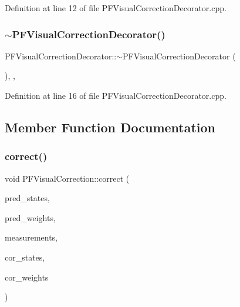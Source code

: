Definition at line 12 of file P\+F\+Visual\+Correction\+Decorator.\+cpp.

\mbox{\label{classbfl_1_1PFVisualCorrectionDecorator_ae534cfef158d8c24d02262d2c037a375}} 
\subsubsection{\texorpdfstring{$\sim$\+P\+F\+Visual\+Correction\+Decorator()}{~PFVisualCorrectionDecorator()}}
{\footnotesize\ttfamily P\+F\+Visual\+Correction\+Decorator\+::$\sim$\+P\+F\+Visual\+Correction\+Decorator (\begin{DoxyParamCaption}{ }\end{DoxyParamCaption})\hspace{0.3cm}{\ttfamily [protected]}, {\ttfamily [virtual]}, {\ttfamily [noexcept]}}



Definition at line 16 of file P\+F\+Visual\+Correction\+Decorator.\+cpp.



\subsection{Member Function Documentation}
\mbox{\label{classbfl_1_1PFVisualCorrection_a85b68264ccaf46d5e68f8ea9c93d82cd}} 
\subsubsection{\texorpdfstring{correct()}{correct()}}
{\footnotesize\ttfamily void P\+F\+Visual\+Correction\+::correct (\begin{DoxyParamCaption}\item[{const Eigen\+::\+Ref$<$ const Eigen\+::\+Matrix\+Xf $>$ \&}]{pred\+\_\+states,  }\item[{const Eigen\+::\+Ref$<$ const Eigen\+::\+Vector\+Xf $>$ \&}]{pred\+\_\+weights,  }\item[{cv\+::\+Input\+Array}]{measurements,  }\item[{Eigen\+::\+Ref$<$ Eigen\+::\+Matrix\+Xf $>$}]{cor\+\_\+states,  }\item[{Eigen\+::\+Ref$<$ Eigen\+::\+Vector\+Xf $>$}]{cor\+\_\+weights }\end{DoxyParamCaption})\hspace{0.3cm}{\ttfamily [inherited]}}



